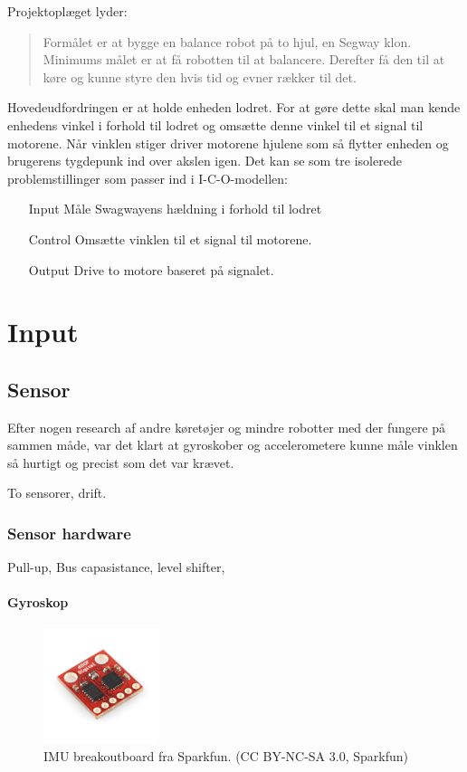 \documentclass[a4paper,oneside,article,danish,table]{memoir}
\begin{document}
Projektoplæget lyder:
\begin{quote}
  Formålet er at bygge en balance robot på to hjul, en Segway klon. Minimums målet er at få robotten til at balancere. Derefter få den til at køre og kunne styre den hvis tid og evner rækker til det.
\end{quote}

Hovedeudfordringen er at holde enheden lodret. For at gøre dette skal man kende enhedens vinkel i forhold til lodret og omsætte denne vinkel til et signal til motorene. Når vinklen stiger driver motorene hjulene som så flytter enheden og brugerens tygdepunk ind over akslen igen.
Det kan se som tre isolerede problemstillinger som passer ind i I-C-O-modellen:
\begin{itemize}
\item[Input] Måle Swagwayens hældning i forhold til lodret
\item[Control] Omsætte vinklen til et signal til motorene.
\item[Output] Drive to motore baseret på signalet.
\end{itemize}

\chapter{Input}

\section{Sensor}
Efter nogen research af andre køretøjer og mindre robotter med der fungere på sammen måde, var det klart at gyroskober og accelerometere kunne måle vinklen så hurtigt og precist som det var krævet.

To sensorer, drift.
\subsection{Sensor hardware}
Pull-up, Bus capasistance, level shifter,

\subsubsection{Gyroskop}


\begin{figure}[htbp]
  \centering
  \includegraphics[width=0.3\textwidth]{pictures/imu.jpg}
  \caption[IMU breakoutboard fra Sparkfun]{IMU breakoutboard fra Sparkfun. (CC BY-NC-SA 3.0, Sparkfun)}
  \label{fig:imu}
\end{figure}
\end{document}
